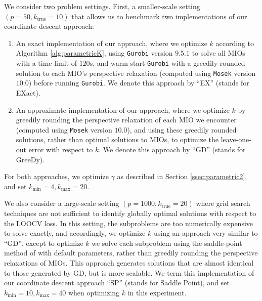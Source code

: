 \documentclass[opre,nonblindrev]{informs3} %
\begin{document}
We consider two problem settings. First, a smaller-scale setting $(p=50, k_{\text{true}}=10)$ that allows us to benchmark two implementations of our coordinate descent approach: 
\begin{enumerate}
    \item An exact implementation of our approach, where we optimize $k$ according to Algorithm \ref{alg:parametricK}, using \verb|Gurobi| version $9.5.1$ to solve all MIOs with a time limit of $120$s, and warm-start \verb|Gurobi| with a greedily rounded solution to each MIO's perspective relaxation (computed using \verb|Mosek| version $10.0$) before running \verb|Gurobi|. We denote this approach by ``EX'' (stands for EXact).
    \item An approximate implementation of our approach, where we optimize $k$ by greedily rounding the perspective relaxation of each MIO we encounter (computed using \verb|Mosek| version $10.0$), and using these greedily rounded solutions, rather than optimal solutions to MIOs, to optimize the leave-one-out error with respect to $k$. We denote this approach by ``GD'' (stands for GreeDy).
\end{enumerate}
For both approaches, we optimize $\gamma$ as described in Section \ref{ssec:parametric2}, and set $k_{\min}=4, k_{\max}=20$.

We also consider a large-scale setting $(p=1000, k_{\text{true}}=20)$ where grid search techniques are not sufficient to identify globally optimal solutions with respect to the LOOCV loss. In this setting, the subproblems are too numerically expensive to solve exactly, and accordingly, we optimize $k$ using an approach very similar to ``GD'', except to optimize $k$ we solve each subproblem using the saddle-point method of \cite{bertsimas2020sparse2} with default parameters, rather than greedily rounding the perspective relaxations of MIOs. This approach generates solutions that are almost identical to those generated by GD, but is more scalable. We term this implementation of our coordinate descent approach ``SP'' (stands for Saddle Point), and set $k_{\min}=10, k_{\max}=40$ when optimizing $k$ in this experiment. 
\end{document}
